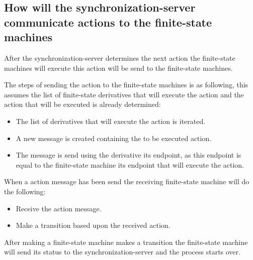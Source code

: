 \hypertarget{how-will-the-synchronization-server-communicate-actions-to-the-finite-state-machines}{%
\subsection{How will the synchronization-server communicate actions to
the finite-state
machines}\label{how-will-the-synchronization-server-communicate-actions-to-the-finite-state-machines}}

After the synchronization-server determines the next action the
finite-state machines will execute this action will be send to the
finite-state machines.

The steps of sending the action to the finite-state machines is as
following, this assumes the list of finite-state derivatives that will
execute the action and the action that will be executed is already
determined:

\begin{itemize}
\tightlist
\item
  The list of derivatives that will execute the action is iterated.
\item
  A new message is created containing the to be executed action.
\item
  The message is send using the derivative its endpoint, as this
  endpoint is equal to the finite-state machine its endpoint that will
  execute the action.
\end{itemize}

When a action message has been send the receiving finite-state machine
will do the following:

\begin{itemize}
\tightlist
\item
  Receive the action message.
\item
  Make a transition based upon the received action.
\end{itemize}

After making a finite-state machine makes a transition the finite-state
machine will send its status to the synchronization-server and the
process starts over.
